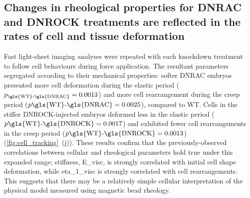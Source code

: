 \subsection{Changes in rheological properties for \gls{DNRAC} and \gls{DNROCK} treatments are reflected in the rates of cell and tissue deformation}

Fast \gls{light-sheet} imaging analyses were repeated with each knockdown treatment to follow cell behaviours during force application.
The resultant parameters segregated according to their mechanical properties: softer \gls{DNRAC} embryos presented more cell deformation during the elastic period (\(p_\text{\gls{WT}-\gls{DNRAC}} = 0.0013\)) and more cell rearrangement during the creep period (\(p\text{\gls{WT}-\gls{DNRAC}} = 0.0025\)), compared to \gls{WT}.
Cells in the stiffer \gls{DNROCK}-injected embryos deformed less in the elastic period (\(p\text{\gls{WT}-\gls{DNROCK}} = 0.0017\)) and exhibited fewer cell rearrangements in the creep period (\(p\text{\gls{WT}-\gls{DNROCK}} = 0.0013\)) (\ref{fig:cell_tracking}~(j)).
These results confirm that the previously-observed correlations between cellular and rheological parameters hold true under this expanded range;
stiffness, \gls{E_visc}, is strongly correlated with initial cell shape deformation, while \gls{eta_1_visc} is strongly correlated with cell rearrangements.
This suggests that there may be a relatively simple cellular interpretation of the physical model measured using magnetic bead rheology.

